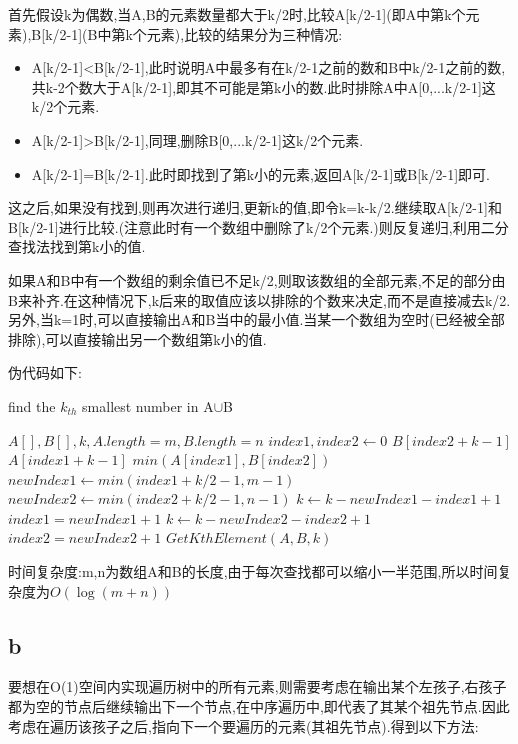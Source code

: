 \documentclass[12pt,a4paper,fontset=none]{ctexart}
\begin{document}
首先假设k为偶数,当A,B的元素数量都大于k/2时,比较A[k/2-1](即A中第k个元素),B[k/2-1](B中第k个元素),比较的结果分为三种情况:
\begin{itemize}
	\item A[k/2-1]<B[k/2-1],此时说明A中最多有在k/2-1之前的数和B中k/2-1之前的数,共k-2个数大于A[k/2-1],即其不可能是第k小的数.此时排除A中A[0,...k/2-1]这k/2个元素.
	\item A[k/2-1]>B[k/2-1],同理,删除B[0,...k/2-1]这k/2个元素.
	\item A[k/2-1]=B[k/2-1].此时即找到了第k小的元素,返回A[k/2-1]或B[k/2-1]即可.
\end{itemize}
这之后,如果没有找到,则再次进行递归,更新k的值,即令k=k-k/2.继续取A[k/2-1]和B[k/2-1]进行比较.(注意此时有一个数组中删除了k/2个元素.)则反复递归,利用二分查找法找到第k小的值.

如果A和B中有一个数组的剩余值已不足k/2,则取该数组的全部元素,不足的部分由B来补齐.在这种情况下,k后来的取值应该以排除的个数来决定,而不是直接减去k/2.另外,当k=1时,可以直接输出A和B当中的最小值.当某一个数组为空时(已经被全部排除),可以直接输出另一个数组第k小的值.

伪代码如下:
\begin{algorithm}
	\renewcommand{\algorithmicensure}{\textbf{Output:}}
	\renewcommand{\algorithmicrequire}{\textbf{Input:}}
	\caption{find the $k_{th}$ smallest number in A$\cup$B }
	\label{alg1}
	\begin{algorithmic}
		\Require $A[],B[],k,A.length=m,B.length=n$
		\State $index1,index2\gets 0$
		\State \Return $B[index2+k-1]$
		\EndIf
		\State \Return $A[index1+k-1]$
		\EndIf
		\State \Return $min(A[index1],B[index2])$
		\EndIf
		\State $newIndex1\gets min(index1 + k/2 - 1, m - 1)$
		\State $newIndex2\gets min(index2+ k/2-1,n-1)$
		\State $k\gets k-newIndex1-index1+1$
		\State $index1=newIndex1+1$
		\Else
		\State $k \gets k-newIndex2-index2+1$
		\State $index2=newIndex2+1$
		\EndIf
		\EndWhile
		\EndFunction
		\Ensure $GetKthElement(A,B,k)$
	\end{algorithmic}
\end{algorithm}
时间复杂度:m,n为数组A和B的长度,由于每次查找都可以缩小一半范围,所以时间复杂度为$O(\log (m+n))$
\subsection*{b}
要想在O(1)空间内实现遍历树中的所有元素,则需要考虑在输出某个左孩子,右孩子都为空的节点后继续输出下一个节点,在中序遍历中,即代表了其某个祖先节点.因此考虑在遍历该孩子之后,指向下一个要遍历的元素(其祖先节点).得到以下方法:
\end{document}
